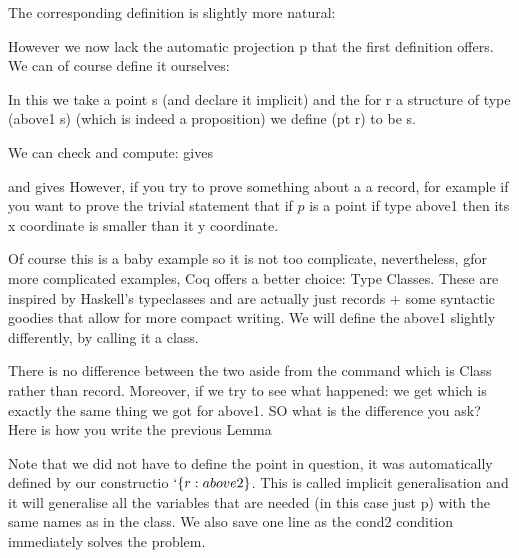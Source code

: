 The corresponding definition is slightly more natural:

However we now lack the automatic projection p that the first definition offers. We can of course define it ourselves:

In this we take a point s (and declare it implicit) and the for r a structure of type (above1 s) (which is indeed a proposition) we define (pt r) to be s.

We can check and compute:
gives 

and 
gives 
However, if you try to prove something about a a record, for example if you want to prove the trivial statement that if $p$ is a point if type above1 then its x coordinate is smaller than it y coordinate.


Of course this is a baby example so it is not too complicate, nevertheless, gfor more complicated examples, Coq offers a better choice: Type Classes. These are inspired by Haskell's typeclasses and are actually just records + some syntactic goodies that allow for more compact writing. We will define the above1 slightly differently, by calling it a class.
  
There is no difference between the two aside from the command which is Class rather than record. Moreover, if we try to see what happened:
  we get 
which is exactly the same thing we got for above1. SO what is the difference you ask? Here is how you write the previous Lemma  


Note that we did not have to define the point in question, it was automatically defined by our constructio  $`\{r:above2\}$. This is called implicit generalisation and it will generalise all the variables that are needed (in this case just p) with the same names as in the class. We also save one line as the cond2 condition immediately solves the problem.

